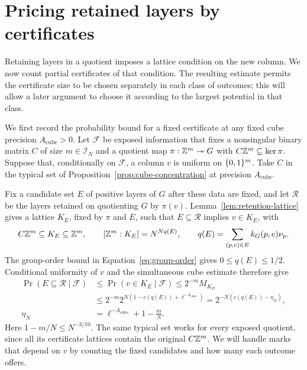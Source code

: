 \section{Pricing retained layers by certificates}\label{sec:certificate-pricing}

Retaining layers in a quotient imposes a lattice condition on the new
column. We now count partial certificates of that condition. The resulting
estimate permits the certificate size to be chosen separately in each
class of outcomes; this will allow a later argument to choose it according
to the largest potential in that class.

We first record the probability bound for a fixed certificate at any
fixed cube precision \(A_{\mathrm{cube}}>0\). Let \(\mathcal F\) be exposed
information that fixes a nonsingular binary matrix \(C\) of size
\(m\in\mathcal I_N\) and a quotient map
\(\pi:\mathbb Z^m\twoheadrightarrow G\) with \(C\mathbb Z^m\subseteq\ker\pi\).
Suppose that, conditionally on \(\mathcal F\), a column \(v\) is uniform
on \(\{0,1\}^m\). Take \(C\) in the typical set of
Proposition~\ref{prop:cube-concentration} at precision
\(A_{\mathrm{cube}}\).

Fix a candidate set \(E\) of positive layers of \(G\) after these data
are fixed, and let \(\mathcal R\) be the layers retained on quotienting
\(G\) by \(\pi(v)\). Lemma~\ref{lem:retention-lattice} gives a lattice
\(K_E\), fixed by \(\pi\) and \(E\), such that \(E\subseteq\mathcal R\)
implies \(v\in K_E\), with
\[
 C\mathbb Z^m\subseteq K_E\subseteq\mathbb Z^m,\qquad
 [\mathbb Z^m:K_E]=N^{Nq(E)},\qquad
 q(E)=\sum_{(p,e)\in E}k_G(p,e)\nu_p.
\]
The group-order bound in Equation~\eqref{eq:group-order} gives
\(0\le q(E)\le1/2\). Conditional uniformity of \(v\) and the
simultaneous cube estimate therefore give
\begin{equation}\label{eq:fixed-certificate-probability}
 \begin{aligned}
 \Pr(E\subseteq\mathcal R\mid\mathcal F)
 &\le \Pr(v\in K_E\mid\mathcal F)
 \le 2^{-m}M_{K_E}\\
 &\le 2^{-m}2^{N(1-c(q(E))+\ell^{-A_{\mathrm{cube}}})}
 =2^{-N(c(q(E))-\eta_N)},\\
 \eta_N&=\ell^{-A_{\mathrm{cube}}}+1-\frac mN.
 \end{aligned}
\end{equation}
Here \(1-m/N\le N^{-3/10}\). The same typical set works for every
exposed quotient, since all its certificate lattices contain the original
\(C\mathbb Z^m\).
We will handle marks that depend on \(v\) by counting the fixed candidates
and how many each outcome offers.

